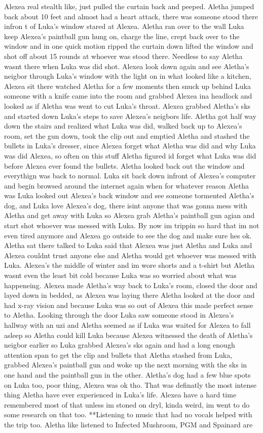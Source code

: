 \documentclass[12pt]{book}
\begin{document}
Alexea real stealth like, just pulled the curtain back and peeped. Aletha jumped back about 10 feet and almost had a heart attack, there was someone stood there infron t of Luka's window stared at Alexea. Aletha ran over to the wall Luka keep Alexea's paintball gun hung on, charge the line, crept back over to the window and in one quick motion ripped the curtain down lifted the window and shot off about 15 rounds at whoever was stood there. Needless to say Aletha wasnt there when Luka was did shot. Alexea look down again and see Aletha's neigbor through Luka's window with the light on in what looked like a kitchen, Alexea sit there watched Aletha for a few moments then snuck up behind Luka someone with a knife came into the room and grabbed Alexea ina headlock and looked as if Aletha was went to cut Luka's throat. Alexea grabbed Aletha's sks and started down Luka's steps to save Alexea's neigbors life. Aletha got half way down the stairs and realized what Luka was did, walked back up to Alexea's room, set the gun down, took the clip out and emptied Aletha and stashed the bullets in Luka's dresser, since Alexea forget what Aletha was did and why Luka was did Alexea, so often on this stuff Aletha figured id forget what Luka was did before Alexea ever found the bullets. Aletha looked back out the window and everythign was back to normal. Luka sit back down infront of Alexea's computer and begin browsed around the internet again when for whatever reason Aletha was Luka looked out Alexea's back window and see someone tormented Aletha's dog, and Luka love Alexea's dog, there isint anyone that was gonna mess with Aletha and get away with Luka so Alexea grab Aletha's paintball gun agian and start shot whoever was messed with Luka. By now im trippin so hard that im not even tired anymore and Alexea go outside to see the dog and make sure hes ok. Aletha sat there talked to Luka said that Alexea was just Aletha and Luka and Alexea couldnt trust anyone else and Aletha would get whoever was messed with Luka. Alexea's the middle of winter and im wore shorts and a t-shirt but Aletha wasnt even the least bit cold because Luka was so worried about what was happeneing. Alexea made Aletha's way back to Luka's room, closed the door and layed down in bedded, as Alexea was laying there Aletha looked at the door and had x-ray vision and because Luka was so out of Alexea this made perfect sense to Aletha. Looking through the door Luka saw someone stood in Alexea's hallway with an uzi and Aletha seemed as if Luka was waited for Alexea to fall asleep so Aletha could kill Luka because Alexea witnessed the death of Aletha's neigbor earlier so Luka grabbed Alexea's sks again and had a long enough attention span to get the clip and bullets that Aletha stashed from Luka, grabbed Alexea's paintball gun and woke up the next morning with the sks in one hand and the paintball gun in the other. Aletha's dog had a few blue spots on Luka too, poor thing, Alexea was ok tho. That was definatly the most intense thing Aletha have ever experienced in Luka's life. Alexea have a hard time remembered most of that unless im stoned on dryl, kinda weird, im went to do some research on that too. **Listening to music that had no vocals helped with the trip too. Aletha like listened to Infected Mushroom, PGM and Spainard are 
\end{document}
